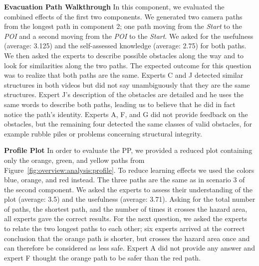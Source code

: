 \documentclass[conference,10pt,letter]{IEEEtran}
\begin{document}
\noindent \textbf{Evacuation Path Walkthrough} In this component, we evaluated the combined effects of the first two components. We generated two camera paths from the longest path in component 2; one path moving from the \emph{Start} to the \emph{POI} and a second moving from the \emph{POI} to the \emph{Start}. We asked for the usefulness (average: 3.125) and the self-assessed knowledge (average: 2.75) for both paths. We then asked the experts to describe possible obstacles along the way and to look for similarities along the two paths. The expected outcome for this question was to realize that both paths are the same. Experts C and J detected similar structures in both videos but did not say unambiguously that they are the same structures. Expert J's description of the obstacles are detailed and he uses the same words to describe both paths, leading us to believe that he did in fact notice the path's identity. Experts A, F, and G did not provide feedback on the obstacles, but the remaining four detected the same classes of valid obstacles, for example rubble piles or problems concerning structural integrity. %

\noindent \textbf{Profile Plot} In order to evaluate the PP, we provided a reduced plot containing only the orange, green, and yellow paths from Figure~\ref{fig:overview:analysis:profile}. To reduce learning effects we used the colors blue, orange, and red instead. The three paths are the same as in scenario 3 of the second component. We asked the experts to assess their understanding of the plot (average: 3.5) and the usefulness (average: 3.71). Asking for the total number of paths, the shortest path, and the number of times it crosses the hazard area, all experts gave the correct results. For the next question, we asked the experts to relate the two longest paths to each other; six experts arrived at the correct conclusion that the orange path is shorter, but crosses the hazard area once and can therefore be considered as less safe. Expert A did not provide any answer and expert F thought the orange path to be safer than the red path.
\end{document}
